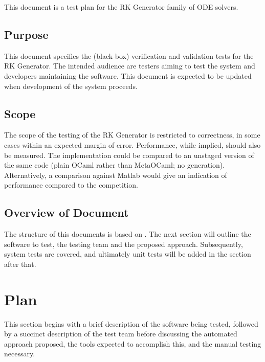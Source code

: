 \documentclass[12pt, titlepage]{article}
\begin{document}
This document is a test plan for the RK Generator family of ODE solvers.

\subsection{Purpose}

This document specifies the (black-box) verification and validation tests for 
the RK Generator. The intended audience are testers aiming to test the system 
and developers maintaining the software. This document is expected to be 
updated when development of the system proceeds.

\subsection{Scope}

The scope of the testing of the RK Generator is restricted to correctness, in 
some cases within an expected margin of error. Performance, while implied, 
should also be measured. The implementation could be compared to an unstaged 
version of the same code (plain OCaml rather than MetaOCaml; no generation). 
Alternatively, a comparison against Matlab would give an indication of 
performance compared to the competition.



\subsection{Overview of Document}
The structure of this documents is based on \cite{Smith2006}. The next section 
will outline the software to test, the testing team and the proposed approach.
Subsequently, system tests are covered, and ultimately unit tests will be added 
in the section after that. 

\section{Plan}
This section begins with a brief description of the software being tested, 
followed by a succinct description of the test team before discussing the 
automated approach proposed, the tools expected to accomplish this, and the 
manual testing necessary.
\end{document}
